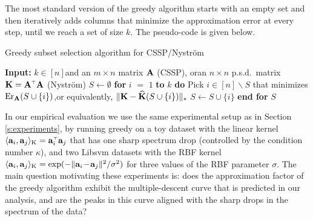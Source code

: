 \documentclass{article}
\begin{document}
The most standard version of the greedy algorithm
\citep[see, e.g.,][]{Bhaskara2016GreedyCSS} 
starts with an empty set and then
iteratively adds columns that minimize the 
approximation error at every step, until we reach a set of size
$k$. 
The pseudo-code is given below.
\renewcommand{\thealgorithm}{}
\begin{algorithm}[H]
  \caption{Greedy subset selection algorithm for CSSP/Nystr\"om}
  \begin{algorithmic}[0]
    \STATE \textbf{Input:} $k\in[n]$\quad and \quad an $m\times n$
    matrix $\mathbf A$ (CSSP), \quad or\quad an $n\times 
    n$ p.s.d.~matrix $\K=\A^\top\A$ (Nystr\"om)\vspace{2mm}
    \STATE $S\leftarrow \emptyset$
    \STATE \textbf{for} $i$ $=$ $1$ \textbf{to} $k$ \textbf{do}
    \STATE \quad Pick $i\in[n]\backslash S$ that minimizes $\mathrm{Er}_\mathbf A(S\cup\{i\})$,\quad or
    equivalently, $\|\mathbf K-{\widehat{\mathbf K}}(S\cup\{i\})\|_*$
    \STATE \quad$S\leftarrow S\cup\{i\}$
    \STATE \textbf{end for}\vspace{2mm}
    \RETURN $S$
  \end{algorithmic}
\end{algorithm}
\vspace{-4mm}
In our empirical evaluation we use the same experimental setup as in
Section \ref{s:experiments}, by running greedy on a toy dataset with
the linear kernel $\langle\a_i,\a_j\rangle_\text{K}=\a_i^\top\a_j$
that has one sharp spectrum drop (controlled by the condition number $\kappa$),
and two Libsvm datasets with the RBF kernel
$\langle\mathbf a_i,\mathbf a_j\rangle_\text{K}=\exp(-\|\mathbf a_i\!-\!\mathbf a_j\|^2/\sigma^2)$
for three values of the RBF parameter $\sigma$. The main question
motivating these experiments is: does the approximation factor of the
greedy algorithm exhibit the multiple-descent curve that is predicted in
our analysis, and are the peaks in this curve aligned with the sharp drops
in the spectrum of the data?
\end{document}

